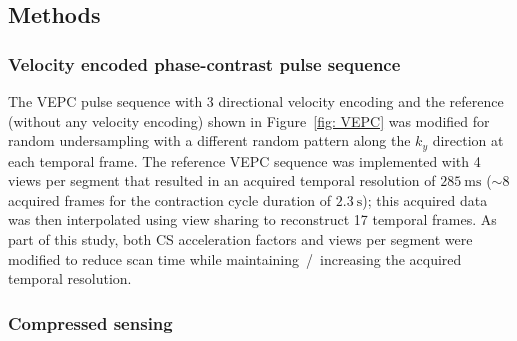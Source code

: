 \subsection{Methods}
\subsubsection{Velocity encoded phase-contrast pulse sequence}
The VEPC pulse sequence with 3 directional velocity encoding and the reference (without any velocity encoding) shown in Figure~\ref{fig: VEPC} was modified for random undersampling with a different random pattern along the $k_y$ direction at each temporal frame. 
The reference VEPC sequence was implemented with 4 views per segment that resulted in an acquired temporal resolution of $\SI{285}{\milli\second}$  ($\sim 8$ acquired frames for the contraction cycle duration of $\SI{2.3}{\second}$); this acquired data was then interpolated using view sharing to reconstruct 17 temporal frames. 
As part of this study, both CS acceleration factors and views per segment were modified to reduce scan time while maintaining~/~increasing the acquired temporal resolution.
\subsubsection{Compressed sensing}

